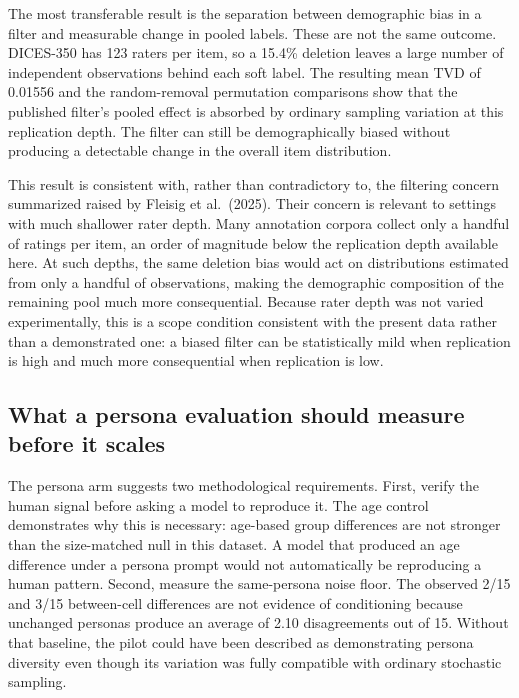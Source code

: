 \documentclass[11pt,a4paper]{article}
\begin{document}
The most transferable result is the separation between demographic bias in a filter and
measurable change in pooled labels. These are not the same outcome. DICES-350 has 123 raters per
item, so a 15.4\% deletion leaves a large number of independent observations behind each soft
label. The resulting mean TVD of 0.01556 and the random-removal permutation comparisons show that
the published filter's pooled effect is absorbed by ordinary sampling variation at this
replication depth. The filter can still be demographically biased without producing a detectable
change in the overall item distribution.

This result is consistent with, rather than contradictory to, the filtering concern summarized
raised by Fleisig et al.\ (2025). Their concern is relevant to settings with much shallower rater
depth.
Many annotation corpora collect only a handful of ratings per item, an order of magnitude below
the replication depth available here.
At such depths, the same deletion bias would act on distributions estimated from only a handful
of observations, making the demographic composition of the remaining pool much more
consequential. Because rater depth was not varied experimentally, this is a scope condition consistent
with the present data rather than a demonstrated one: a biased filter can be
statistically mild when replication is high and much more consequential when replication is low.

\subsection{What a persona evaluation should measure before it scales}

The persona arm suggests two methodological requirements. First, verify the human signal before
asking a model to reproduce it. The age control demonstrates why this is necessary: age-based
group differences are not stronger than the size-matched null in this dataset. A model that
produced an age difference under a persona prompt would not automatically be reproducing a human
pattern. Second, measure the same-persona noise floor. The observed 2/15 and 3/15 between-cell
differences are not evidence of conditioning because unchanged personas produce an average of
2.10 disagreements out of 15. Without that baseline, the pilot could have been described as
demonstrating persona diversity even though its variation was fully compatible with ordinary
stochastic sampling.
\end{document}
